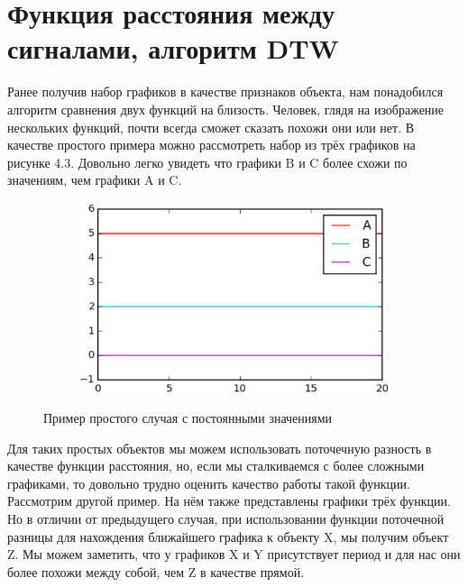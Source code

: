 \section{Функция расстояния между сигналами, алгоритм DTW}

Ранее получив набор графиков в качестве признаков объекта, нам понадобился алгоритм сравнения двух функций на близость. Человек, глядя на изображение нескольких функций, почти всегда сможет сказать похожи они или нет. В качестве простого примера можно рассмотреть набор из трёх графиков на рисунке 4.3. Довольно легко увидеть что графики B и C более схожи по значениям, чем графики A и C.

\begin{figure}[ht]
	\centering
    \begin{subfigure}[b]{1\textwidth}
    \centering
        \includegraphics[scale=0.5]{pasted-image-35.png}        
    \end{subfigure}
 
    \caption{Пример простого случая с постоянными значениями}
    \label{fig_parsetree}
\end{figure}

Для таких простых объектов мы можем использовать поточечную разность в качестве функции расстояния, но, если мы сталкиваемся с более сложными графиками, то довольно трудно оценить качество работы такой функции.
Рассмотрим другой пример.
На нём также представлены графики трёх функции.
Но в отличии от предыдущего случая, при использовании функции поточечной разницы для нахождения ближайшего графика к объекту X, мы получим объект Z.
Мы можем заметить, что у графиков X и Y присутствует период и для нас они более похожи между собой, чем Z в качестве прямой.

